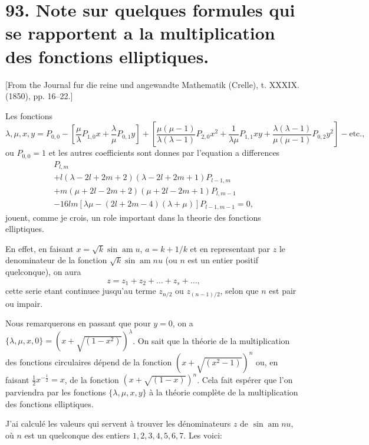 \documentclass[12pt,a4paper]{article}
\theoremstyle{definition}
\begin{document}
\newpage

\section*{93. Note sur quelques formules qui se rapportent a la multiplication des fonctions elliptiques.}

[From the Journal fur die reine und angewandte Mathematik (Crelle), t. XXXIX. (1850), pp. 16--22.]

Les fonctions
\[
{\lambda, \mu, x, y} = P_{0,0} - [\frac{\mu}{\lambda} P_{1,0} x + \frac{\lambda}{\mu} P_{0,1} y] + [\frac{\mu(\mu-1)}{\lambda(\lambda-1)} P_{2,0} x^2 + \frac{1}{\lambda\mu} P_{1,1} xy + \frac{\lambda(\lambda-1)}{\mu(\mu-1)} P_{0,2} y^2] - \text{etc.},
\]
ou $P_{0,0} = 1$ et les autres coefficients sont donnes par l'equation a differences
\begin{multline*}
[-l\lambda - m\mu + (l - m)^2] P_{l,m} \\
+ l(\lambda - 2l + 2m + 2)(\lambda - 2l + 2m + 1) P_{l-1,m} \\
+ m(\mu + 2l - 2m + 2)(\mu + 2l - 2m + 1) P_{l,m-1} \\
- 16lm[\lambda\mu - (2l + 2m - 4)(\lambda + \mu)] P_{l-1,m-1} = 0,
\end{multline*}
jouent, comme je crois, un role important dans la theorie des fonctions elliptiques.

En effet, en faisant $x = \sqrt{k} \sin \operatorname{am} u$, $a = k + 1/k$ et en representant par $z$ le denominateur de la fonction $\sqrt{k} \sin \operatorname{am} nu$ (ou $n$ est un entier positif quelconque), on aura
\[
z = z_1 + z_2 + \ldots + z_s + \ldots,
\]
cette serie etant continuee jusqu'au terme $z_{n/2}$ ou $z_{(n-1)/2}$, selon que $n$ est pair ou impair.

Nous remarquerons en passant que pour $y = 0$, on a $\{\lambda, \mu, x, 0\} = (x + \sqrt{(1 - x^2)})^{\lambda}$. On sait que la th\'{e}orie de la multiplication des fonctions circulaires d\'{e}pend de la fonction $(x + \sqrt{(x^2 - 1)})^n$ ou, en faisant $\frac{1}{2}x^{-\frac{1}{2}} = x$, de la fonction $(x + \sqrt{(1 - x)})^n$. Cela fait esp\'{e}rer que l'on parviendra par les fonctions $\{\lambda, \mu, x, y\}$ \`{a} la th\'{e}orie compl\`{e}te de la multiplication des fonctions elliptiques.

J'ai calcul\'{e} les valeurs qui servent \`{a} trouver les d\'{e}nominateurs $z$ de $\sin \operatorname{am} nu$, o\`{u} $n$ est un quelconque des entiers $1, 2, 3, 4, 5, 6, 7$. Les voici:
\end{document}
